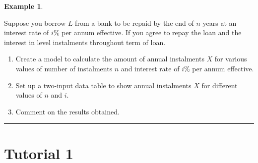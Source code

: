 \documentclass[
]{article}
\theoremstyle{definition}
\theoremstyle{definition}
\newtheorem{example}{Example}[section]
\theoremstyle{definition}
\theoremstyle{definition}
\theoremstyle{remark}
\begin{document}
\begin{example}
\protect\hypertarget{exm:unlabeled-div-12}{}\label{exm:unlabeled-div-12}

Suppose you borrow \(L\) from a bank to be repaid by the end of \(n\) years
at an interest rate of \(i\%\) per annum effective. If you agree to repay
the loan and the interest in level instalments throughout term of loan.

\begin{enumerate}
\def\labelenumi{\arabic{enumi}.}
\item
  Create a model to calculate the amount of annual instalments \(X\) for
  various values of number of instalments \(n\) and interest rate of
  \(i\%\) per annum effective.
\item
  Set up a two-input data table to show annual instalments \(X\) for
  different values of \(n\) and \(i\).
\item
  Comment on the results obtained.
\end{enumerate}

\end{example}

\begin{center}\rule{0.5\linewidth}{0.5pt}\end{center}

\hypertarget{tutorial-1}{%
\section{Tutorial 1}\label{tutorial-1}}
\end{document}
